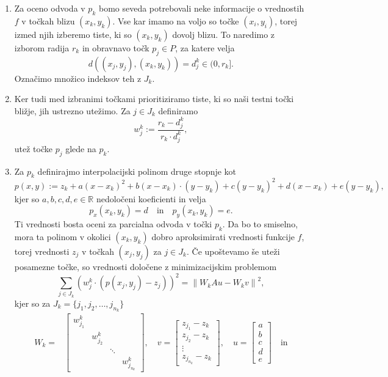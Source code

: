 \documentclass[ letterpaper, titlepage, fleqn]{article}
\newcommand{\R}{\mathbb R}
\newcommand{\norm}[1]{\left\lVert#1\right\rVert}
\begin{document}
{\begin{enumerate}
\item Za oceno odvoda v $p_k$  bomo seveda potrebovali neke informacije o vrednostih $f$ 
v točkah blizu $(x_k,y_k)$. Vse kar imamo na voljo so točke $(x_i,y_i)$, torej izmed njih
izberemo tiste, ki so $(x_k,y_k)$ dovolj blizu. To naredimo z izborom radija $r_k$ in obravnavo točk $p_j \in P$, 
za katere velja
$$d((x_j,y_j), (x_k,y_k)) = d^k_j \in (0, r_k].$$
Označimo množico indeksov teh z $J_k$.
\item Ker tudi med izbranimi točkami prioritiziramo tiste, ki so naši testni točki bližje,
jih ustrezno utežimo. Za $j \in J_k$ definiramo
$$w^k_j := \frac{r_k - d^k_j}{r_k \cdot d^k_j},$$
utež točke $p_j$ glede na $p_k$. 
\item Za $p_k$ definirajmo interpolacijski polinom druge stopnje kot
$$p(x,y) := z_k + a (x - x_k)^2 + b (x - x_k) \cdot (y - y_k) + c (y - y_k)^2 + d (x-x_k) + e(y-y_k),$$
kjer so $a,b,c,d,e \in \R$ nedoločeni koeficienti in velja 
$$p_x(x_k,y_k) = d \quad \text{in} \quad p_y(x_k,y_k) = e.$$
Ti vrednosti bosta oceni za parcialna odvoda v točki $p_k$.
Da bo to smiselno, mora ta polinom v okolici $(x_k,y_k)$ dobro aproksimirati vrednosti funkcije $f$, 
torej vrednosti $z_j$ v točkah $(x_j,y_j)$ za $j \in J_k$.
Če upoštevamo še uteži posamezne točke, so vrednosti določene z minimizacijskim problemom
$$\sum_{j\in J_k} (w^k_j \cdot (p(x_j,y_j) - z_j))^2 = \norm{W_k Au - W_k v}^2,$$
kjer so za $J_k = \{j_1, j_2, \dots, j_{n_k}\}$ \\
\begin{equation*}
\begin{aligned}
W_k = &
\begin{bmatrix}
w_{j_1}^k &  &  &  \\
& w_{j_2}^k &  &  \\
& & \ddots & \\
&  &  & w_{j_{n_k}}^k
\end{bmatrix},
\quad
v = 
\begin{bmatrix}
z_{j_1}- z_k \\
z_{j_2} - z_k \\
\vdots  \\
z_{j_{n_k}} - z_k
\end{bmatrix}, \quad
u =
\begin{bmatrix}
a \\
b \\
c \\
d \\
e
\end{bmatrix} \quad \text{in} \\[6pt]

\end{aligned}
\end{equation*}
\end{enumerate}}
\end{document}
